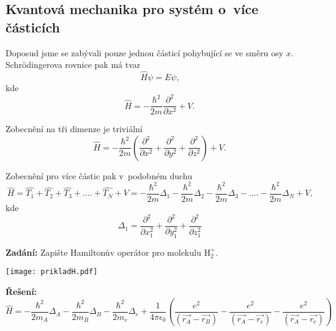 \subsection{Kvantová mechanika pro systém o~více částicích}

Doposud jsme se zabývali pouze jednou částicí pohybující se ve směru osy $x$. Schr\"odingerova rovnice pak má tvar
\begin{equation}
\hat{H}\psi = E\psi \mbox{,}
\label{rov:Vicecastic1}
\end{equation}
kde
\begin{equation}
\hat{H} = -\frac{\hbar^2}{2m}\frac{\partial^2}{\partial x^2} + V{.}
\label{rov:Vicecastic2}
\end{equation}

\noindent Zobecnění na tři dimenze je triviální
\begin{equation}
\hat{H} = -\frac{\hbar^2}{2m}\left( \frac{\partial^2}{\partial x^2} + \frac{\partial^2}{\partial y^2} + \frac{\partial^2}{\partial z^2} \right ) + V \mbox{.}
\label{rov:Vicecastic3}
\end{equation}

\noindent Zobecnění pro více částic pak v~podobném duchu
\begin{equation}
\hat{H} = \hat{T_1} + \hat{T_2} + \hat{T_3} + .... + \hat{T_N} + V = -\frac{\hbar^2}{2m}\Delta_1 - \frac{\hbar^2}{2m}\Delta_2 - \frac{\hbar^2}{2m}\Delta_3 - .... - \frac{\hbar^2}{2m}\Delta_N + V \mbox{,}
\label{rov:Vicecastic3}
\end{equation}
kde
\begin{equation}
\Delta_1 = \frac{\partial^2}{\partial x_1^2} + \frac{\partial^2}{\partial y_1^2} + \frac{\partial^2}{\partial z_1^2}
\label{rov:Vicecastic4}
\end{equation}

\begin{priklad}
\textbf{Zadání:}  Zapište Hamiltonův operátor pro molekulu H$_2^{+}$.

\begin{center}
\texttt{[image: prikladH.pdf]}

\end{center}

\textbf{Řešení:}
\begin{equation}
\hat{H} = -\frac{\hbar ^2}{2m_A} \Delta _A - \frac{\hbar^2}{2m_B}\Delta _B -\frac{\hbar^2}{2m_e}\Delta _e + \frac{1}{4\pi \epsilon _0} \left( \frac{e^2}{(\vec{r_A} - \vec{r_B})} - \frac{e^2}{(\vec{r_A} - \vec{r_e})}  - \frac{e^2}{(\vec{r_A} - \vec{r_e})} \right)
\nonumber
\label{rov:Vicecastic5}
\end{equation}

\end{priklad}





